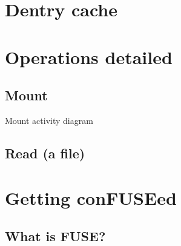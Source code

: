 \documentclass{beamer}
\begin{document}
\section{Dentry cache}


\section{Operations detailed}

\subsection{Mount}

\begin{frame}{Mount activity diagram}
	
	
\end{frame}

\subsection{Read (a file)}


\section{Getting conFUSEed}

\subsection{What is FUSE?}
\end{document}
